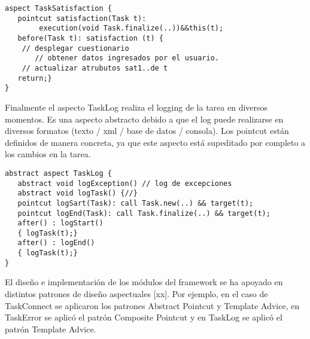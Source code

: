 \begin{verbatim}
aspect TaskSatisfaction {
   pointcut satisfaction(Task t):
        execution(void Task.finalize(..))&&this(t);	
   before(Task t): satisfaction (t) {
	// desplegar cuestionario 
       // obtener datos ingresados por el usuario.
	// actualizar atrubutos sat1..de t
   return;}
}

\end{verbatim}

Finalmente el aspecto TaskLog  realiza el logging de la tarea en diversos momentos. Es una aspecto abstracto debido a que el log puede realizarse en diversos formatos (texto / xml / base de datos / consola). Los pointcut están definidos de manera concreta, ya que este aspecto está supeditado por completo a los cambios en la tarea.  

\begin{verbatim}
abstract aspect TaskLog {
   abstract void logException() // log de excepciones
   abstract void logTask() {//}
   pointcut logSart(Task): call Task.new(..) && target(t);
   pointcut logEnd(Task): call Task.finalize(..) && target(t);
   after() : logStart()
   { logTask(t);}
   after() : logEnd()
   { logTask(t);}
}

\end{verbatim}

El diseño e implementación de los módulos del framework se ha apoyado en distintos patrones de diseño aspectuales [xx]. Por ejemplo, en el caso de TaskConnect se aplicaron los patrones Abstract Pointcut y Template Advice, en TaskError se aplicó el patrón Composite Pointcut y en TaskLog se aplicó el patrón Template Advice.